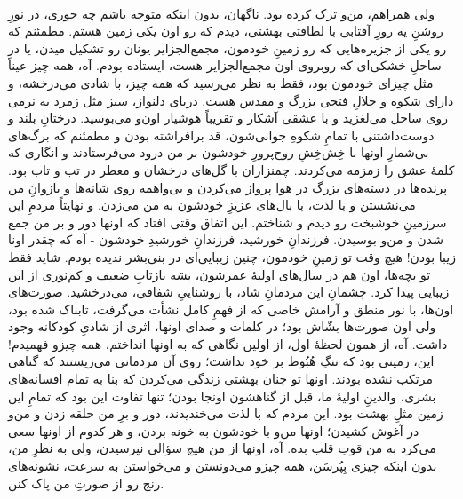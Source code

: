 \documentclass[12pt]{book}
\begin{document}
    \paragraph{}
    ولی همراهم، من‌و ترک کرده بود. ناگهان، بدون اینکه متوجه باشم چه جوری، در نورِ روشنِ یه روزِ آفتابی با لطافتی بهشتی، دیدم که رو اون یکی زمین هستم. مطمئنم که رو یکی از جزیره‌هایی که رو زمینِ خودمون، مجمع‌الجزایر یونان رو تشکیل میدن، یا در ساحلِ خشکی‌ای که روبروی اون مجمع‌الجزایر هست، ایستاده بودم. آه، همه چیز عیناً مثل چیزای خودمون بود، فقط به نظر می‌رسید که همه چیز، با شادی می‌درخشه، و دارای شکوه و جلالِ فتحی بزرگ و مقدس هست. دریای دلنواز، سبز مثل زمرد به نرمی روی ساحل می‌لغزید و با عشقی آشکار و تقریباً هوشیار اون‌و می‌بوسید. درختانِ بلند و دوست‌داشتنی با تمامِ شکوهِ جوانی‌شون،  قد برافراشته بودن و مطمئنم که برگ‌های بی‌شمارِ اونها با خِش‌خِشِ روح‌پرورِ خودشون بر من درود می‌فرستادند و انگاری که کلمهٔ عشق را زمزمه می‌کردند. چمنزاران با گل‌های درخشان و معطر در تب و تاب بود. پرنده‌ها در دسته‌های بزرگ در هوا پرواز می‌کردن و بی‌واهمه روی شانه‌ها و بازوانِ من می‌نشستن و با لذت، با بال‌های عزیزِ خودشون به من می‌زدن. و نهایتاً مردمِ این سرزمینِ خوشبخت رو دیدم و شناختم. این اتفاق وقتی افتاد که اونها دور و بر من جمع شدن و من‌و بوسیدن. فرزندانِ خورشید، فرزندانِ خورشیدِ خودشون - آه که چقدر اونا زیبا بودن! هیچ وقت تو زمینِ خودمون، چنین زیبایی‌ای در بنی‌بشر ندیده بودم. شاید فقط تو بچه‌ها، اون هم در سال‌های اولیهٔ عمرشون، بشه بازتابِ ضعیف و کم‌نوری از این زیبایی پیدا کرد. چشمانِ این مردمانِ شاد، با روشناییِ شفافی، می‌درخشید. صورت‌های اون‌ها، با نور منطق و آرامش خاصی که از فهمِ کامل نشأت می‌گرفت، تابناک شده بود، ولی اون صورت‌ها بشّاش بود؛ در کلمات و صدای اونها، اثری از شادیِ کودکانه وجود داشت. آه، از همون لحظهٔ اول، از اولین نگاهی که به اونها انداختم، همه چیزو فهمیدم! این، زمینی بود که ننگِ هُبُوط بر خود نداشت؛ روی آن مردمانی می‌زیستند که گناهی مرتکب نشده بودند. اونها تو چنان بهشتی زندگی می‌کردن که بنا به تمام افسانه‌های بشری، والدینِ اولیهٔ ما، قبل از گناهشون اونجا بودن؛ تنها تفاوت این بود که تمامِ این زمین مثلِ بهشت بود. این مردم که با لذت می‌خندیدند، دور و برِ من حلقه زدن و من‌و در آغوش کشیدن؛ اونها من‌و با خودشون به خونه بردن، و هر کدوم از اونها سعی می‌کرد به من قوتِ قلب بده. آه، اونها از من هیچ سؤالی نپرسیدن، ولی به نظرِ من، بدون اینکه چیزی بِپُرسَن، همه چیزو می‌دونستن و می‌خواستن به سرعت، نشونه‌های رنج رو از صورتِ من پاک کنن.
\end{document}
